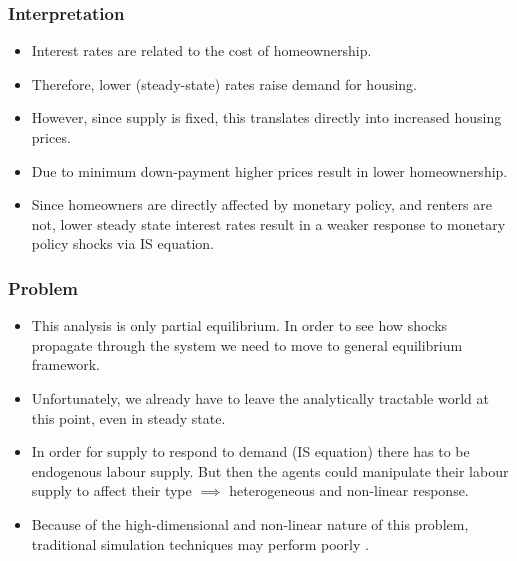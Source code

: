 \documentclass{beamer}
\begin{document}
\begin{frame}
    \frametitle{Interpretation}
    \begin{itemize}
        \item Interest rates are related to the cost of homeownership.
        \item Therefore, lower (steady-state) rates raise demand for housing.
        \item However, since supply is fixed, this translates directly into increased housing prices.
        \item Due to minimum down-payment higher prices result in lower homeownership.
        \item Since homeowners are directly affected by monetary policy, and renters are not, lower steady state interest rates result in a weaker response to monetary policy shocks via IS equation.
    \end{itemize}
\end{frame}

\begin{frame}
    \frametitle{Problem}
    \begin{itemize}
        \item This analysis is only partial equilibrium. In order to see how shocks propagate through the system we need to move to general equilibrium framework. 
        \item Unfortunately, we already have to leave the analytically tractable world at this point, even in steady state.
        \item In order for supply to respond to demand (IS equation) there has to be endogenous labour supply. But then the agents could manipulate their labour supply to affect their type $\implies$ heterogeneous and non-linear response.
        \item Because of the high-dimensional and non-linear nature of this problem, traditional simulation techniques may perform poorly \parencite{han2021deepham}.
    \end{itemize}
\end{frame}
\end{document}

